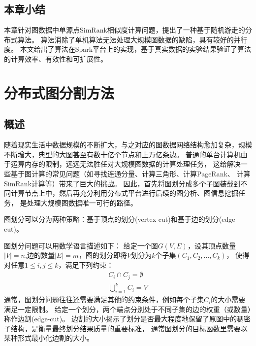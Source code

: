 \documentclass[master]{njuthesis}
\begin{document}
\section{本章小结}
本章针对图数据中单源点SimRank相似度计算问题，提出了一种基于随机游走的分布式算法。
算法消除了单机算法无法处理大规模图数据的缺陷，具有较好的并行度。
本文给出了算法在Spark平台上的实现，基于真实数据的实验结果验证了算法的计算效率、有效性和可扩展性。
\chapter{分布式图分割方法}\label{chapter_graphpartition}
\section{概述}
随着现实生活中数据规模的不断扩大，与之对应的图数据网络结构愈加复杂，规模不断增大，典型的大图甚至有数十亿个节点和上万亿条边。
普通的单台计算机由于运算内存的限制，远远无法胜任对大规模图数据的计算处理任务，
这给解决一些基于图计算的常见问题（如寻找连通分量\cite{DBLP:conf/sc/HongRO13}、计算三角形\cite{DBLP:journals/corr/abs-1011-0468}、计算PageRank\cite{page1999pagerank}、
计算SimRank\cite{jeh2002simrank}计算等）带来了巨大的挑战。
因此，首先将图划分成多个子图装载到不同计算节点上中，然后再充分利用分布式平台进行后续的图分析、图信息挖掘任务，
是处理大规模图数据唯一可行的路径。

图划分可以分为两种策略：基于顶点的划分(vertex cut)和基于边的划分(edge cut)。

图划分问题可以用数学语言描述如下： 给定一个图$G(V, E)$，设其顶点数量$|V|=n$,边的数量$|E|=m$，图的划分即将$V$划分为$k$个子集$(C_1, C_2, \dots, C_k)$，
使得对任意$1 \leq i,j \leq k$，满足下列约束：
\begin{equation}
\begin{aligned}
\label{eq:4-1}
 C_i \cap C_j=\emptyset \\
 \bigcup\limits_{i=1}^{k} C_{i} = V
 \end{aligned}
\end{equation}
通常，图划分问题往往还需要满足其他的约束条件，例如每个子集$C_i$的大小需要满足一定限制。
给定一个划分，两个端点分别处于不同子集的边的权重（或数量）称作边割(edge-cut)。
边割的大小揭示了划分是否最大程度地保留了原图中的稠密子结构，是衡量最终划分结果质量的重要标准，
通常图划分的目标函数里需要以某种形式最小化边割的大小。
\end{document}
